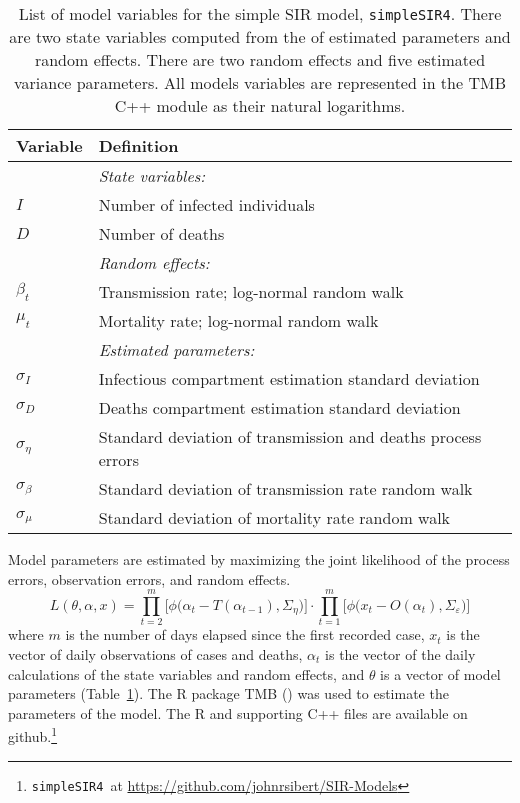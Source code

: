 \documentclass[12pt,letterpaper]{article}
\newcommand\SSm{{\tt simpleSIR4}}
\begin{document}
\begin{table}
\caption{List of model variables for the simple SIR model, \SSm.
There are two state variables computed from the of estimated
parameters and random effects.
There are two random effects and five estimated variance parameters.
All models variables are represented in the TMB C++ module as their
natural logarithms.
}
\label{tab:allvars1}
\begin{center}
\begin{tabular}{ll}
\hline
Variable & Definition\\
\hline
\hline
       & {\it State variables:}\\
$I$      & Number of infected individuals\\
$D$      & Number of deaths\\
       & {\it Random effects:}\\
$\beta_t$ & Transmission rate; log-normal random walk\\
$\mu_t$   & Mortality rate; log-normal random walk\\
       & {\it Estimated parameters:}\\
$\sigma_I$ & Infectious compartment estimation standard deviation\\
$\sigma_D$ & Deaths compartment estimation standard deviation\\
$\sigma_\eta$ & Standard deviation of transmission and deaths process errors\\
$\sigma_\beta$ & Standard deviation of transmission rate random walk\\
$\sigma_\mu$ & Standard deviation of mortality rate random walk\\
\hline
\end{tabular}
\end{center}
\end{table}

Model parameters are estimated by
maximizing the joint likelihood of the process errors, observation
errors, and random effects.
\begin{equation}
\label{eqn:likelihood}
L(\theta,\alpha,x)=
\prod^m_{t=2}\big[\phi\big(\alpha_t-T(\alpha_{t-1}), \Sigma_\eta\big)\big]\cdot
\prod^m_{t=1}\big[\phi\big(x_t-O(\alpha_t),
\Sigma_\varepsilon\big)\big]
\end{equation}
where $m$ is the number of days elapsed since the first recorded case,
$x_t$ is the vector of daily observations of cases and deaths,
$\alpha_t$ is the vector of the daily calculations of the state
variables and random effects,
and $\theta$ 
is a vector of model parameters (Table~\ref{tab:allvars1}).
The R package TMB (\cite{TMB0000}) was used to 
estimate the parameters of the model. 
The R and supporting C++ files are available on 
github.\footnote{\SSm~at \url{https://github.com/johnrsibert/SIR-Models}}
\end{document}

